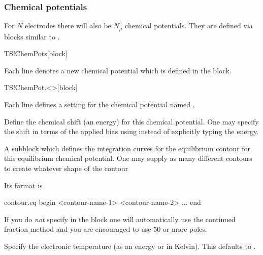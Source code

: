 \subsubsection{Chemical potentials}
\label{sec:ts:chem-pot}

For $N$ electrodes there will also be $N_\mu$ chemical
potentials. They are defined via blocks similar to .

\begin{fdfentry}{TS!ChemPots}[block]
  
  Each line denotes a new chemical potential which is 
  defined in the  block.
  
\end{fdfentry}

\begin{fdfentry}{TS!ChemPot.<>}[block]

  Each line defines a setting for the chemical potential named
  \fdf*{<>}.


  \begin{fdfoptions}
    

    Define the chemical shift (an energy) for this chemical
    potential. One may specify the shift in terms of the applied bias
    using  instead of explicitly typing the energy.

    \option[contour.eq]%
    A subblock which defines the integration curves for the
    equilibrium contour for this equilibrium chemical potential. One
    may supply as many different contours to create whatever shape of
    the contour
    
    Its format is
    \begin{fdfexample}
      contour.eq
       begin
        <contour-name-1>
        <contour-name-2>
        ...
       end
    \end{fdfexample}

    \note If you do \emph{not} specify  in the block
    one will automatically use the continued fraction method and you
    are encouraged to use $50$ or more poles\cite{Ozaki2010}.


    Specify the electronic temperature (as an energy or in
    Kelvin). This defaults to .


\end{fdfoptions}
\end{fdfentry}
